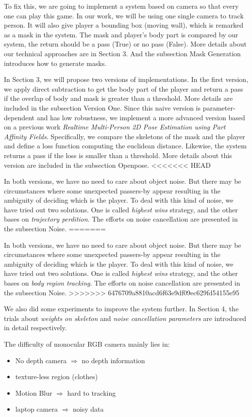 \documentclass[11pt,twocolumn,letterpaper]{article}
\begin{document}
    \par To fix this, we are going to implement a system based on camera so that every one can play this game.
        In our work, we will be using one single camera to track person. It will also give player a bounding box (moving wall), which is remarked as a mask in the system.
        The mask and player's body part is compared by our system, the return should be a pass (True) or no pass (False). More details about our technical approaches are in Section 3. And the subsection Mask Generation introduces how to generate masks.
    \par In Section 3, we will propose two versions of implementations. In the first version, we apply direct subtraction to get the body part of the player and return a pass if the overlap of body and mask is greater than a threshold. More details are included in the subsection Version One. Since this naive version is parameter-dependent and has low robustness, we implement a more advanced version based on a previous work \textit{Realtime Multi-Person 2D Pose Estimation using Part Affinity Fields}\cite{cao2017realtime}. Specifically, we compare the skeletons of the mask and the player and define a loss function computing the euclidean distance. Likewise, the system returns a pass if the loss is smaller than a threshold. More details about this version are included in the subsection Openpose.
<<<<<<< HEAD
    \par In both versions, we have no need to care about object noise. But there may be circumstances where some unexpected passers-by appear resulting in the ambiguity of deciding which is the player. To deal with this kind of noise, we have tried out two solutions. One is called \emph{highest wins} strategy, and the other bases on \emph{trajectory perdition}. The efforts on noise cancellation are presented in the subsection Noise.
=======
    \par In both versions, we have no need to care about object noise. But there may be circumstances where some unexpected passers-by appear resulting in the ambiguity of deciding which is the player. To deal with this kind of noise, we have tried out two solutions. One is called \emph{highest wins} strategy, and the other bases on \emph{body region tracking}. The efforts on noise cancellation are presented in the subsection Noise.
>>>>>>> 6476709a8810acd6f63e9df09ec629fd54155e95
    \par We also did some experiments to improve the system further. In Section 4, the trials about \emph{weights on skeleton} and \emph{noise cancellation parameters} are introduced in detail respectively.
    \par
    The difficulty of monocular RGB camera mainly lies in:
    \begin{itemize}
    \item No depth camera $\Rightarrow$ no depth information
    \item texture-less region (clothes)
    \item Motion Blur $\Rightarrow$ hard to tracking
    \item laptop camera $\Rightarrow$ noisy data
    \end{itemize}
\end{document}
